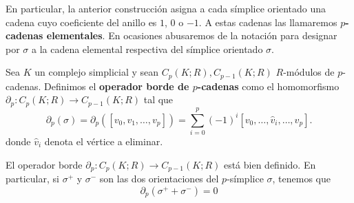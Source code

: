 \begin{observacion}
	En particular, la anterior construcción asigna a cada símplice orientado una
	cadena cuyo coeficiente del anillo es $1$, $0$ o $-1$. A estas cadenas las
	llamaremos \textbf{$p$-cadenas elementales}. En ocasiones abusaremos de la
	notación para designar por $\sigma$ a la cadena elemental respectiva del
	símplice orientado $\sigma$.
\end{observacion}

\begin{definicion}
	Sea $K$ un complejo simplicial y sean $C_{p}(K;R), C_{p-1}(K;R)$ $R$-módulos de
	$p$-cadenas. Definimos el \textbf{operador borde de $p$-cadenas} como el homomorfismo
	$\partial_{p}: C_{p}(K;R) \to C_{p-1}(K;R)$ tal que
	\[
	\partial_{p}(\sigma) = \partial_{p}([v_{0}, v_{1}, \ldots, v_{p}]) = \sum_{i=0}
	^{p}(-1)^{i}[v_{0}, \ldots, \hat{v}_{i}, \ldots, v_{p}] .
	\]
	donde $\hat{v}_{i}$ denota el vértice a eliminar.
\end{definicion}
%
\begin{lema}
	El operador borde $\partial_{p}: C_{p}(K;R) \to C_{p-1}(K;R)$ está bien definido.
	En particular, si $\sigma^{+}$ y $\sigma^{-}$ son las dos orientaciones del $p$-símplice
	$\sigma$, tenemos que
	\[
	\partial_{p}(\sigma^{+}+\sigma^{-}) = 0
	\]
\end{lema}
